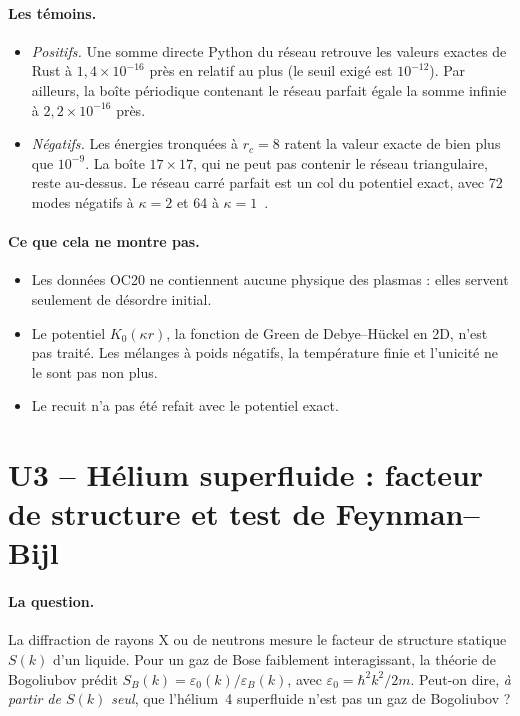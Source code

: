 \paragraph{Les témoins.}
\begin{itemize}
\item \emph{Positifs.} Une somme directe Python du réseau retrouve les valeurs exactes de Rust à
$1{,}4\times10^{-16}$ près en relatif au plus (le seuil exigé est $10^{-12}$). Par ailleurs, la boîte périodique contenant le réseau parfait égale la somme
infinie à $2{,}2\times10^{-16}$ près.
\item \emph{Négatifs.} Les énergies tronquées à $r_c=8$ ratent la valeur exacte de bien plus que $10^{-9}$. La boîte
$17\times17$, qui ne peut pas contenir le réseau triangulaire, reste au-dessus. Le réseau carré parfait est un col
du potentiel exact, avec 72 modes négatifs à $\kappa=2$ et 64 à $\kappa=1$~\cite{ch2yuk}.
\end{itemize}

\paragraph{Ce que cela ne montre pas.}
\begin{itemize}
\item Les données OC20 ne contiennent aucune physique des plasmas : elles servent seulement de désordre initial.
\item Le potentiel $K_0(\kappa r)$, la fonction de Green de Debye--Hückel en 2D, n'est pas traité. Les mélanges à poids
négatifs, la température finie et l'unicité ne le sont pas non plus.
\item Le recuit n'a pas été refait avec le potentiel exact.
\end{itemize}

\section[U3 -- Hélium superfluide et test de Feynman--Bijl]{U3 -- Hélium superfluide : facteur de structure et test de Feynman--Bijl}\label{ch5:U3}

\paragraph{La question.} La diffraction de rayons X ou de neutrons mesure le facteur de structure statique $S(k)$
d'un liquide. Pour un gaz de Bose faiblement interagissant, la théorie de Bogoliubov prédit
$S_B(k)=\varepsilon_0(k)/\varepsilon_B(k)$, avec $\varepsilon_0=\hbar^2k^2/2m$. Peut-on dire, \emph{à partir de
$S(k)$ seul}, que l'hélium~4 superfluide n'est pas un gaz de Bogoliubov ?

